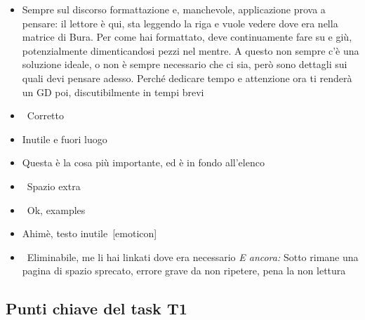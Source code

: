 {\begin{itemize}
  \item {} Sempre sul discorso formattazione e, manchevole, applicazione prova a pensare: il lettore è qui, sta leggendo la riga e vuole vedere dove era nella matrice di Bura. Per come hai formattato, deve continuamente fare su e giù, potenzialmente dimenticandosi pezzi nel mentre. A questo non sempre c'è una soluzione ideale, o non è sempre necessario che ci sia, però sono dettagli sui quali devi pensare adesso. Perché dedicare tempo e attenzione ora ti renderà un GD poi, discutibilmente in tempi brevi
  \item {} \rvBene\ Corretto
  \item {} Inutile e fuori luogo
  \item {} Questa è la cosa più importante, ed è in fondo all'elenco
  \item \rvVuoto\ Spazio extra
  \item {} \rvBene\ Ok, examples
  \item {} Ahimè, testo inutile [emoticon]
  \item {} \rvAvviso\ Eliminabile, me li hai linkati dove era necessario \emph{E ancora:} Sotto rimane una pagina di spazio sprecato, errore grave da non ripetere, pena la non lettura
\end{itemize}
}

\subsection{Punti chiave del task T1}
\label{rv:t1:sec:punti-chiave}


